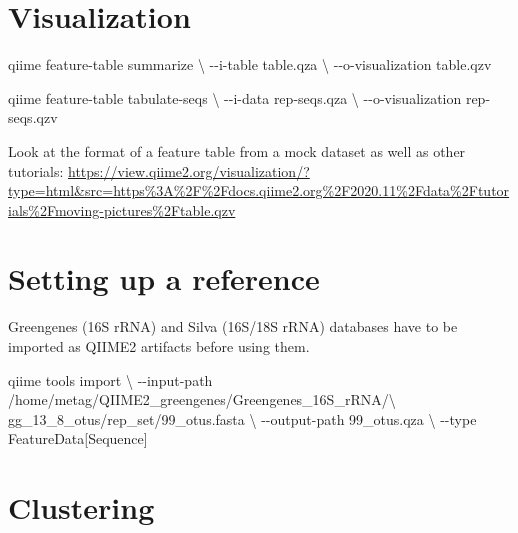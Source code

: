 \documentclass[
]{book}
\newenvironment{Shaded}{\begin{snugshade}}{\end{snugshade}}
\newcommand{\DataTypeTok}[1]{\textcolor[rgb]{0.13,0.29,0.53}{#1}}
\newcommand{\ExtensionTok}[1]{#1}
\newcommand{\NormalTok}[1]{#1}
\begin{document}
\hypertarget{visualization}{%
\section{Visualization}\label{visualization}}

\begin{Shaded}
\begin{Highlighting}[]

\ExtensionTok{qiime}\NormalTok{ feature{-}table summarize }\DataTypeTok{\textbackslash{}}
\NormalTok{{-}{-}i{-}table table.qza }\DataTypeTok{\textbackslash{}}
\NormalTok{{-}{-}o{-}visualization table.qzv}


\ExtensionTok{qiime}\NormalTok{ feature{-}table tabulate{-}seqs }\DataTypeTok{\textbackslash{}}
\NormalTok{{-}{-}i{-}data rep{-}seqs.qza }\DataTypeTok{\textbackslash{}}
\NormalTok{{-}{-}o{-}visualization rep{-}seqs.qzv}
\end{Highlighting}
\end{Shaded}

Look at the format of a feature table from a mock dataset as well as other tutorials:
\url{https://view.qiime2.org/visualization/?type=html\&src=https\%3A\%2F\%2Fdocs.qiime2.org\%2F2020.11\%2Fdata\%2Ftutorials\%2Fmoving-pictures\%2Ftable.qzv}

\hypertarget{setting-up-a-reference}{%
\section{Setting up a reference}\label{setting-up-a-reference}}

Greengenes (16S rRNA) and Silva (16S/18S rRNA) databases have to be imported as QIIME2 artifacts before using them.

\begin{Shaded}
\begin{Highlighting}[]

\ExtensionTok{qiime}\NormalTok{ tools import }\DataTypeTok{\textbackslash{}}
\NormalTok{{-}{-}input{-}path /home/metag/QIIME2\_greengenes/Greengenes\_16S\_rRNA/}\DataTypeTok{\textbackslash{}}
\NormalTok{gg\_13\_8\_otus/rep\_set/99\_otus.fasta }\DataTypeTok{\textbackslash{}}
\NormalTok{{-}{-}output{-}path 99\_otus.qza }\DataTypeTok{\textbackslash{}}
\NormalTok{{-}{-}type FeatureData[Sequence]}
\end{Highlighting}
\end{Shaded}

\hypertarget{clustering-1}{%
\section{Clustering}\label{clustering-1}}
\end{document}
